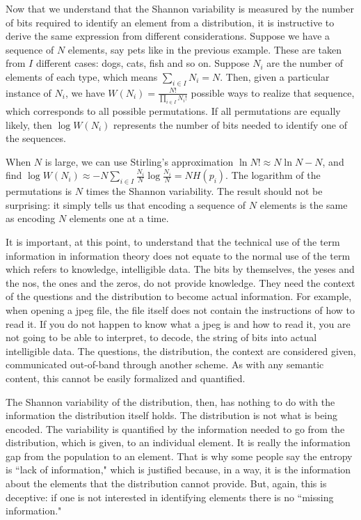 \documentclass[iopart]{revtex4-1}
\begin{document}
Now that we understand that the Shannon variability is measured by the number of bits required to identify an element from a distribution, it is instructive to derive the same expression from different considerations. Suppose we have a sequence of $N$ elements, say pets like in the previous example. These are taken from $I$ different cases: dogs, cats, fish and so on. Suppose $N_i$ are the number of elements of each type, which means $\sum_{i \in I} N_i = N$. Then, given a particular instance of $N_i$, we have $W(N_i) = \frac{N!}{\prod_{i \in I} N_i!}$ possible ways to realize that sequence, which corresponds to all possible permutations. If all permutations are equally likely, then $\log W (N_i)$ represents the number of bits needed to identify one of the sequences.

When $N$ is large, we can use Stirling's approximation $\ln N! \approx N \ln N - N$, and find $\log W(N_i) \approx - N \sum_{i \in I} \frac{N_i}{N} \log \frac{N_i}{N} = N H(p_i)$. The logarithm of the permutations is $N$ times the Shannon variability. The result should not be surprising: it simply tells us that encoding a sequence of $N$ elements is the same as encoding $N$ elements one at a time.

It is important, at this point, to understand that the technical use of the term information in information theory does not equate to the normal use of the term which refers to knowledge, intelligible data. The bits by themselves, the yeses and the nos, the ones and the zeros, do not provide knowledge. They need the context of the questions and the distribution to become actual information. For example, when opening a jpeg file, the file itself does not contain the instructions of how to read it. If you do not happen to know what a jpeg is and how to read it, you are not going to be able to interpret, to decode, the string of bits into actual intelligible data. The questions, the distribution, the context are considered given, communicated out-of-band through another scheme. As with any semantic content, this cannot be easily formalized and quantified.

The Shannon variability of the distribution, then, has nothing to do with the information the distribution itself holds. The distribution is not what is being encoded. The variability is quantified by the information needed to go from the distribution, which is given, to an individual element. It is really the information gap from the population to an element. That is why some people say the entropy is ``lack of information," which is justified because, in a way, it is the information about the elements that the distribution cannot provide. But, again, this is deceptive: if one is not interested in identifying elements there is no ``missing information."
\end{document}
